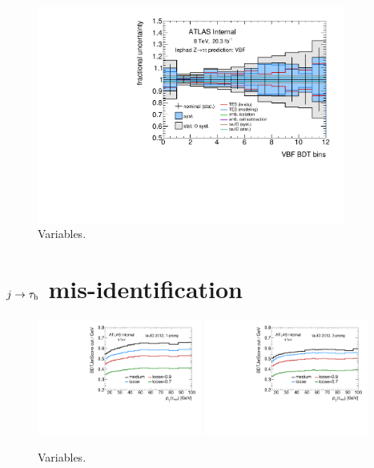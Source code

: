 \clearpage
\begin{figure}[tp]
  \includegraphics[width=0.90\textwidth]{figures/uncertainties/uncertainties_lephad_paper14_8TeV_Ztautau_VBF}
  \caption{Variables.}
  \label{fig:backgrounds-uncertainties-Ztautau}
\end{figure}

\clearpage
\section{$j \rightarrow \tau_\mathrm{h}$ mis-identification}
\label{sec:backgrounds-misid}

\begin{figure}[tp]
  \centering
  \includegraphics[width=0.48\textwidth]{figures/backgrounds/jetBDT-1p}
  \includegraphics[width=0.48\textwidth]{figures/backgrounds/jetBDT-3p}
  \caption{Variables.}
  \label{fig:backgrounds-workingpoints}
\end{figure}

